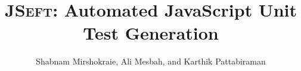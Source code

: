 \documentclass[times]{stvrauth}
\newcommand{\tool}{\textsc{JSeft}\xspace}
\begin{document}
\title{
\tool: Automated JavaScript Unit Test Generation
}


\author{Shabnam Mirshokraie, Ali Mesbah, and Karthik Pattabiraman}
\address{Department of Electrical and Computer Engineering, University of British Columbia, Vancouver, BC, Canada}





\maketitle








\end{document}
